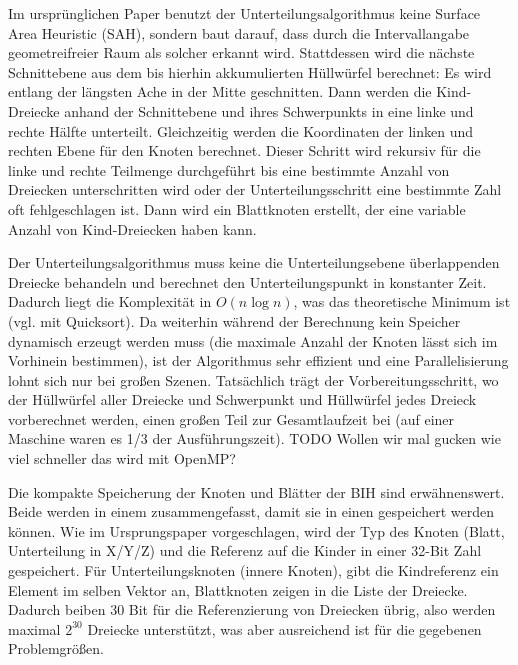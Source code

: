 Im ursprünglichen Paper benutzt der Unterteilungsalgorithmus keine Surface Area Heuristic (SAH), sondern baut darauf, dass durch die Intervallangabe geometreifreier Raum als solcher erkannt wird. Stattdessen wird die nächste Schnittebene aus dem bis hierhin akkumulierten Hüllwürfel berechnet: Es wird entlang der längsten Ache in der Mitte geschnitten. Dann werden die Kind-Dreiecke anhand der Schnittebene und ihres Schwerpunkts in eine linke und rechte Hälfte unterteilt. Gleichzeitig werden die Koordinaten der linken und rechten Ebene für den Knoten berechnet. Dieser Schritt wird rekursiv für die linke und rechte Teilmenge durchgeführt bis eine bestimmte Anzahl von Dreiecken unterschritten wird oder der Unterteilungsschritt eine bestimmte Zahl oft fehlgeschlagen ist. Dann wird ein Blattknoten erstellt, der eine variable Anzahl von Kind-Dreiecken haben kann.

Der Unterteilungsalgorithmus muss keine die Unterteilungsebene überlappenden Dreiecke behandeln und berechnet den Unterteilungspunkt in konstanter Zeit. Dadurch liegt die Komplexität in $O(n \log n)$, was das theoretische Minimum ist (vgl. mit Quicksort). Da weiterhin während der Berechnung kein Speicher dynamisch erzeugt werden muss (die maximale Anzahl der Knoten lässt sich im Vorhinein bestimmen), ist der Algorithmus sehr effizient und eine Parallelisierung lohnt sich nur bei großen Szenen. Tatsächlich trägt der Vorbereitungsschritt, wo der Hüllwürfel aller Dreiecke und Schwerpunkt und Hüllwürfel jedes Dreieck vorberechnet werden, einen großen Teil zur Gesamtlaufzeit bei (auf einer Maschine waren es 1/3 der Ausführungszeit). TODO Wollen wir mal gucken wie viel schneller das wird mit OpenMP?

Die kompakte Speicherung der Knoten und Blätter der BIH sind erwähnenswert. Beide werden in einem  zusammengefasst, damit sie in einen  gespeichert werden können. Wie im Ursprungspaper vorgeschlagen, wird der Typ des Knoten (Blatt, Unterteilung in X/Y/Z) und die Referenz auf die Kinder in einer 32-Bit Zahl gespeichert. Für Unterteilungsknoten (innere Knoten), gibt die Kindreferenz ein Element im selben Vektor an, Blattknoten zeigen in die Liste der Dreiecke. Dadurch beiben 30 Bit für die Referenzierung von Dreiecken übrig, also werden maximal $2^{30}$ Dreiecke unterstützt, was aber ausreichend ist für die gegebenen Problemgrößen.

